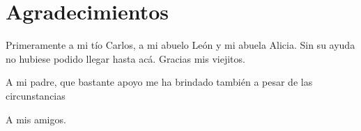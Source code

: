 \chapter*{Agradecimientos}

Primeramente a mi tío Carlos, a mi abuelo León y mi abuela Alicia. Sin su ayuda no hubiese podido llegar hasta acá. Gracias mis viejitos.

A mi padre, que bastante apoyo me ha brindado también a pesar de las circunstancias

A mis amigos.

\pagebreak